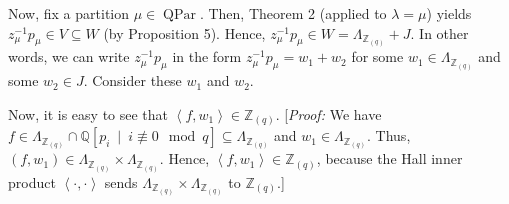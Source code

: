 \documentclass[10pt,a4paper]{article}
\begin{document}
Now, fix a partition $\mu\in\operatorname{QPar}$. Then, Theorem 2 (applied to
$\lambda=\mu$) yields $z_{\mu}^{-1}p_{\mu}\in V\subseteq W$ (by Proposition
5). Hence, $z_{\mu}^{-1}p_{\mu}\in W=\Lambda_{\mathbb{Z}_{\left(  q\right)  }
}+J$. In other words, we can write $z_{\mu}^{-1}p_{\mu}$ in the form $z_{\mu
}^{-1}p_{\mu}=w_{1}+w_{2}$ for some $w_{1}\in\Lambda_{\mathbb{Z}_{\left(
q\right)  }}$ and some $w_{2}\in J$. Consider these $w_{1}$ and $w_{2}$.




Now, it is easy to see that $\left\langle f,w_{1}\right\rangle \in
\mathbb{Z}_{\left(  q\right)  }$. [\emph{Proof:} We have $f\in\Lambda
_{\mathbb{Z}_{\left(  q\right)  }}\cap\mathbb{Q}\left[  p_{i}\ \mid
\ i\not \equiv 0\mod q\right]  \subseteq\Lambda_{\mathbb{Z}
_{\left(  q\right)  }}$ and $w_{1}\in\Lambda_{\mathbb{Z}_{\left(  q\right)  }}$. Thus, $\left(f, w_1\right) \in \Lambda_{\mathbb{Z}_{\left(  q\right)  }}\times\Lambda_{\mathbb{Z}_{\left(  q\right)  }}$.
Hence, $\left\langle f,w_{1}\right\rangle \in\mathbb{Z}_{\left(  q\right)
}$, because the Hall inner product $\left\langle \cdot,\cdot\right\rangle $
sends $\Lambda_{\mathbb{Z}_{\left(  q\right)  }}\times\Lambda_{\mathbb{Z}
_{\left(  q\right)  }}$ to $\mathbb{Z}_{\left(  q\right)  }$.]
\end{document}
